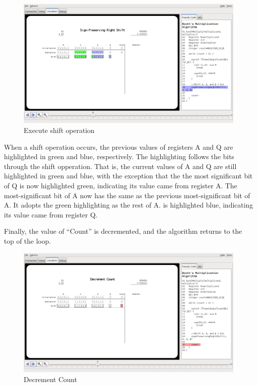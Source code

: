 \documentclass{article}
\begin{document}
\pagebreak
\begin{figure}[h]
\centering
\includegraphics[scale=0.3]{shift.pdf}
\caption{Execute shift operation}
\end{figure}

When a shift operation occurs, the previous values of registers A and Q are highlighted in green and blue, respectively.
The highlighting follows the bits through the shift opperation.
That is, the current values of A and Q are still highlighted in green and blue, with the exception that the the most significant bit of Q is now highlighted green, indicating its value came from register A.
The most-significant bit of A now has the same as the previous most-significant bit of A.
It adopts the green highlighting as the rest of A.%
\beta is highlighted blue, indicating its value came from register Q.

\pagebreak
Finally, the value of ``Count'' is decremented, and the algorithm returns to the top of the loop.

\begin{figure}[h]
\centering
\includegraphics[scale=0.3]{dec.pdf}
\caption{Decrement Count}
\end{figure}
\end{document}
